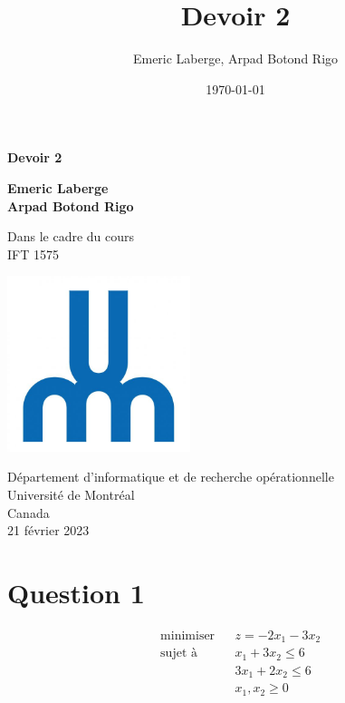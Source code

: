 \documentclass{article}
\title{Devoir 2}
\author{Emeric Laberge, Arpad Botond Rigo}
\date{\today}
\begin{document}
\begin{titlepage}
   \begin{center}
      \vspace*{1cm}
                  
      \Huge
      \textbf{Devoir 2}
                  
      \vspace{0.5cm}
      \LARGE
                  
      \vspace{1.5cm}
                  
      \textbf{Emeric Laberge\\Arpad Botond Rigo}
                  
      \vfill
                  
      Dans le cadre du cours\\
      IFT 1575
      
                  
      \vspace{0.8cm}
                  
      \includegraphics[width=0.4\textwidth]{Université-de-Montréal.jpg}
                   
      \Large
      Département d'informatique et de recherche opérationnelle\\
      Université de Montréal\\
      Canada\\
      21 février 2023
                  
 	\end{center}
\end{titlepage}
\section*{Question 1}
\begin{equation*}
   \begin{aligned}
      & \underset{}{\text{minimiser}}
      & & z = -2x_1 - 3x_2 \\
      & \text{sujet à}
      & & x_1 + 3x_2 \le 6 \\
        &   &   & 3x_1 + 2x_2 \le 6 \\
        &   &   & x_1, x_2 \ge 0    
   \end{aligned}
\end{equation*}
\end{document}
